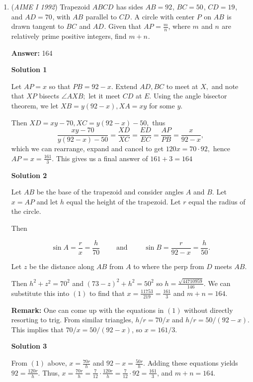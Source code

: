 \begin{enumerate}
	\item (\textit{AIME I 1992}) Trapezoid $ABCD^{}_{}$ has sides $AB=92^{}_{}$, $BC=50^{}_{}$, $CD=19^{}_{}$, and $AD=70^{}_{}$, with $AB^{}_{}$ parallel to $CD^{}_{}$. A circle with center $P^{}_{}$ on $AB^{}_{}$ is drawn tangent to $BC^{}_{}$ and $AD^{}_{}$. Given that $AP^{}_{}=\frac mn$, where $m^{}_{}$ and $n^{}_{}$ are relatively prime positive integers, find $m+n^{}_{}$.


 
 \textbf{Answer: }164



\textbf{Solution 1}

Let $AP=x$ so that $PB=92-x.$ Extend $AD, BC$ to meet at $X,$ and note that $XP$ bisects $\angle AXB;$ let it meet $CD$ at $E.$ Using the angle bisector theorem, we let $XB=y(92-x), XA=xy$ for some $y.$ 

 Then $XD=xy-70, XC=y(92-x)-50,$ thus 
 \[\frac{xy-70}{y(92-x)-50} = \frac{XD}{XC} = \frac{ED}{EC}=\frac{AP}{PB} = \frac{x}{92-x},\] which we can rearrange, expand and cancel to get $120x=70\cdot 92,$ hence $AP=x=\frac{161}{3}$. This gives us a final answer of $161+3=\boxed{164}$




\textbf{Solution 2}

Let $AB$ be the base of the trapezoid and consider angles $A$ and $B$.  Let $x=AP$ and let $h$ equal the height of the trapezoid.  Let $r$ equal the radius of the circle.

 Then

 
 \[\sin{A}= \frac{r}{x} = \frac{h}{70}\qquad\text{ and }\qquad\sin{B}= \frac{r}{92-x}  =  \frac{h}{50}.\tag{1}\]

 Let $z$ be the distance along $AB$ from $A$ to where the perp from $D$ meets $AB$. 

 Then $h^2 +z^2 =70^2$  and $(73-z)^2 + h^2 =50^2$  so $h =\frac{\sqrt{44710959}}{146}$. We can substitute this into $(1)$ to find that $x= \frac{11753}{219} = \frac{161}{3}$ and $m+n = 164$.

 \textbf{Remark:} One can come up with the equations in $(1)$ without directly resorting to trig. From similar triangles, $h/r = 70/x$  and $h/r = 50/ (92-x)$. This implies that $70/x =50/(92-x)$, so $x = 161/3$.

 



\textbf{Solution 3}

From $(1)$ above, $x = \frac{70r}{h}$ and $92-x = \frac{50r}{h}$. Adding these equations yields $92 = \frac{120r}{h}$. Thus, $x = \frac{70r}{h} = \frac{7}{12}\cdot\frac{120r}{h} = \frac{7}{12}\cdot92 = \frac{161}{3}$, and $m+n = \boxed{164}$.


\end{enumerate}
